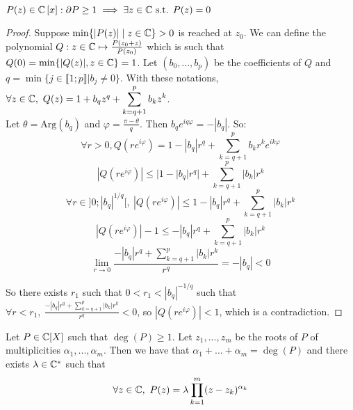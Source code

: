 \begin{theorem}[of d'Alembert]
	$P(z) \in \mathbb{C}\left[ x \right]: \partial P \geq 1 \implies \exists z \in \mathbb{C} \text{ s.t. } P(z)=0$
\end{theorem}
\begin{proof}
	Suppose $\min\{ | P(z) | \mid z \in \mathbb{C} \}>0$ is reached at $z_0$.
	We can define the polynomial $Q:z\in \mathbb{C} \mapsto \frac{P(z_0+z)}{P(z_0)}$ which is such that $Q(0) = \min\{|Q(z)|,z\in \mathbb{C}\} = 1 $.
	Let $(b_0,...,b_p)$ be the coefficients of $Q$ and $q = \min\{ j \in \llbracket 1;p \rrbracket | b_j\neq 0\}$.
	With these notations, $\forall z\in \mathbb{C},~Q(z) = 1+b_qz^q + \displaystyle \sum_{k = q+1}^pb_kz^k$.\\
	Let $\theta = \mathrm{Arg}(b_q)$ and $\varphi = \frac{\pi-\theta}{q}$.
	Then $b_qe^{iq\varphi} =-|b_q|$.
	So:
	$$\forall r >0, Q(re^{i\varphi}) = 1-|b_q|r^q + \sum_{k = q+1}^p b_k r^k e^{ik\varphi}$$
	$$|Q(re^{i\varphi})| \leq |1-|b_q|r^q| + \sum_{k=q+1}^p |b_k|r^k$$
	$$\forall r \in ]0;|b_q|^{1/q}[,~ |Q(re^{i\varphi})|\leq 1-|b_q|r^q+ \sum_{k=q+1}^p |b_k|r^k$$
	$$|Q(re^{i\varphi})|-1\leq -|b_q|r^q+ \sum_{k=q+1}^p |b_k|r^k$$
	$$\lim_{r\rightarrow 0}\frac{-|b_q| r^q+\sum_{k = q+1}^p|b_k|r^k}{r^q} = -|b_q| <0$$
	
	So there exists $r_1$ such that $0 <r_1<|b_q|^{-1/q}$ such that $\forall r< r_1,~\displaystyle \frac{-|b_q| r^q+\sum_{k = q+1}^p|b_k|r^k}{r^q} <0$, so $|Q(re^{i\varphi})|<1$, which is a contradiction.
\end{proof}

\begin{corollary}
	Let $P\in \mathbb{C}[X]$ such that $\deg(P) \geq 1$. Let $z_1,...,z_m$ be the roots of $P$ of multiplicities $\alpha_1,...,\alpha_m$. Then we have that $\alpha_1+...+\alpha_m = \deg(P)$ and there exists $\lambda\in \mathbb{C}^*$ such that
	$$\forall z\in \mathbb{C},~P(z) = \lambda \prod_{k = 1}^m(z-z_k)^{\alpha_k}$$
\end{corollary}
